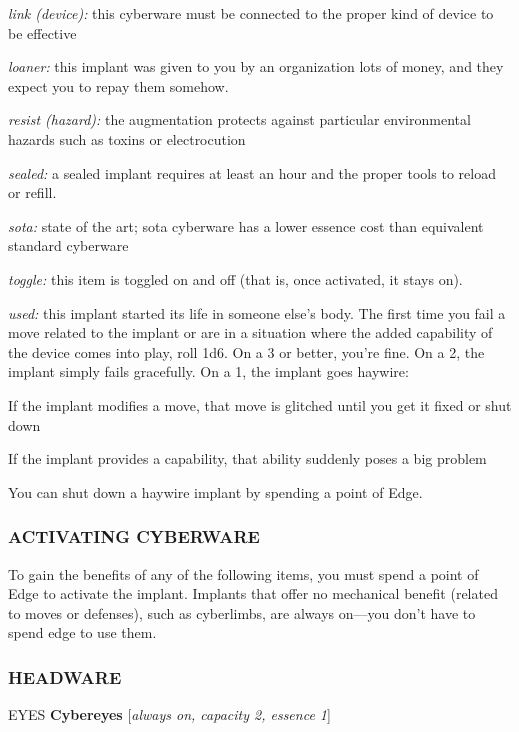 \documentclass[oneside,10pt]{article}
\begin{document}
\begin{multicols}{2}
\begin{adjustwidth*}{.5cm}{.5cm}
\textit{link (device):} this cyberware must be connected to the
proper kind of device to be effective

\textit{loaner:} this implant was given to you by an organization
lots of money, and they expect you to repay them somehow.

\textit{resist (hazard):} the augmentation protects against particular environmental hazards such as toxins or
electrocution

\textit{sealed:} a sealed implant requires at least an hour and the
proper tools to reload or refill.

\textit{sota:} state of the art; sota cyberware has a lower essence
cost than equivalent standard cyberware

\textit{toggle:} this item is toggled on and off (that is, once activated, it stays on).

\textit{used:} this implant started its life in someone else’s body.
The first time you fail a move related to the implant or
are in a situation where the added capability of the device
comes into play, roll 1d6. On a 3 or better, you’re fine. On
a 2, the implant simply fails gracefully. On a 1, the implant
goes haywire:

\begin{adjustwidth*}{.5cm}{.5cm}
\tcirc{} If the implant modifies a move, that move is glitched
until you get it fixed or shut down

\tcirc{} If the implant provides a capability, that ability suddenly
poses a big problem

\tcirc{} You can shut down a haywire implant by spending a
point of Edge.
\end{adjustwidth*}
\end{adjustwidth*}

\subsubsection{ACTIVATING CYBERWARE}
To gain the benefits of any of the following items, you must
spend a point of Edge to activate the implant. Implants that
offer no mechanical benefit (related to moves or defenses),
such as cyberlimbs, are always on—you don’t have to spend
edge to use them.

\subsubsection{HEADWARE}
EYES
\textbf{Cybereyes} [\textit{always on, capacity 2,
  essence 1}]


\end{multicols}
\end{document}
